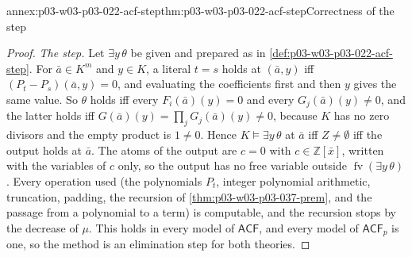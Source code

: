 \begin{annexitem}{annex:p03-w03-p03-022-acf-step}{thm:p03-w03-p03-022-acf-step}{Correctness of the step}
\begin{proof}
\emph{The step.} Let \(\exists y\,\theta\) be given and prepared as in
\cref{def:p03-w03-p03-022-acf-step}. For \(\bar a\in K^m\) and \(y\in K\),
a literal \(t=s\) holds at \((\bar a,y)\) iff \((P_t-P_s)(\bar a,y)=0\),
and evaluating the coefficients first and then \(y\) gives the same value.
So \(\theta\) holds iff every \(F_i(\bar a)(y)=0\) and every
\(G_j(\bar a)(y)\ne0\), and the latter holds iff
\(G(\bar a)(y)=\prod_jG_j(\bar a)(y)\ne0\), because \(K\) has no zero
divisors and the empty product is \(1\ne0\). Hence
\(K\models\exists y\,\theta\) at \(\bar a\) iff \(Z\ne\emptyset\) iff the
output holds at \(\bar a\). The atoms of the output are \(c=0\) with
\(c\in\mathbb Z[\bar x]\), written with the variables of \(c\) only, so
the output has no free variable outside
\(\operatorname{fv}(\exists y\,\theta)\). Every operation used (the
polynomials \(P_t\), integer polynomial arithmetic, truncation, padding, the recursion of
\cref{thm:p03-w03-p03-037-prem}, and the passage from a polynomial to a
term) is computable, and the recursion stops by the decrease of \(\mu\). This
holds in every model of \(\mathsf{ACF}\), and every model of
\(\mathsf{ACF}_p\) is one, so the method is an elimination step for both
theories.
\end{proof}
\end{annexitem}

